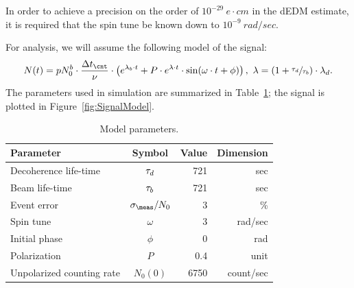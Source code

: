 \documentclass{article}
\begin{document}
In order to achieve a precision on the order of $10^{-29}~e\cdot cm$ in the dEDM estimate, it is required that the spin tune be known down to $10^{-9}~rad/sec$. 

For analysis, we will assume the following model of the signal:
\begin{equation}
	N(t) = pN_0^b\cdot\frac{\dtc}{\nu}\cdot\bkt{e^{\lamb\cdot t} + P\cdot e^{\lambda\cdot t}\cdot\sin(\omega\cdot t + \phi)}, ~ \lambda = (1+\sfrac{\LTd}{\LTb})\cdot \lamd.
\end{equation}
The parameters used in simulation are summarized in Table~\ref{tbl:ModParam}; the signal is plotted in Figure~\ref{fig:SignalModel}.
\begin{table}[h]
	\centering
	\caption{Model parameters.\label{tbl:ModParam}}
	\begin{tabular}{p{2.5cm}crr}
		\hline
		Parameter                 &      Symbol      & Value & Dimension \\ \hline
		Decoherence life-time     &      $\tau_d$      &   721 &       sec \\
		Beam life-time            &      $\tau_b$      &   721 &       sec \\
		Event error               & $\SD{\meas}/N_0$ &     3 &        \% \\
		Spin tune                 &     $\omega$     &     3 &   rad/sec \\
		Initial phase             &      $\phi$      &     0 &       rad \\
		Polarization              &       $P$        &   0.4 &      unit \\
		Unpolarized counting rate &     $N_0(0)$     &  6750 & count/sec \\ \hline
	\end{tabular}
\end{table}
\end{document}
